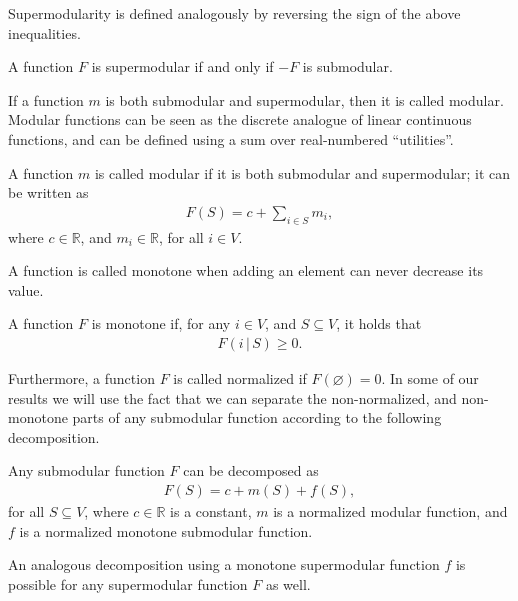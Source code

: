 Supermodularity is defined analogously by reversing the sign of the above inequalities.
\begin{definition}[Supermodularity] \label{def:supermod}
A function $F$ is supermodular if and only if $-F$ is submodular.
\end{definition}

If a function $m$ is both submodular and supermodular, then it is called modular.
Modular functions can be seen as the discrete analogue of linear continuous functions, and can be defined using a sum over real-numbered ``utilities''.
\begin{definition}[Modularity]
A function $m$ is called modular if it is both submodular and supermodular; it can be written as
\begin{align*}
F(S) = c + \sum_{i \in S} m_i,
\end{align*}
where $c \in \mathbb{R}$, and $m_i \in \mathbb{R}$, for all $i \in V$.
\end{definition}

A function is called monotone when adding an element can never decrease its value.
\begin{definition}[Monotonicity]
A function $F$ is monotone if, for any $i \in V$, and $S \subseteq V$, it holds that
\begin{align*}
F(i \,|\, S) \geq 0.
\end{align*}
\end{definition}
Furthermore, a function $F$ is called normalized if $F(\varnothing) = 0$.
In some of our results we will use the fact that we can separate the non-normalized, and non-monotone parts of any submodular function according to the following decomposition.
\begin{definition} \label{def:decomp}
Any submodular function $F$ can be decomposed as
\begin{align*} %
  F(S) = c + m(S) + f(S),
\end{align*}
for all $S \subseteq V$, where $c \in \mathbb{R}$ is a constant, $m$ is a normalized modular function, and $f$ is a normalized monotone submodular function.
\end{definition}
An analogous decomposition using a monotone supermodular function $f$ is possible for any supermodular function $F$ as well.

